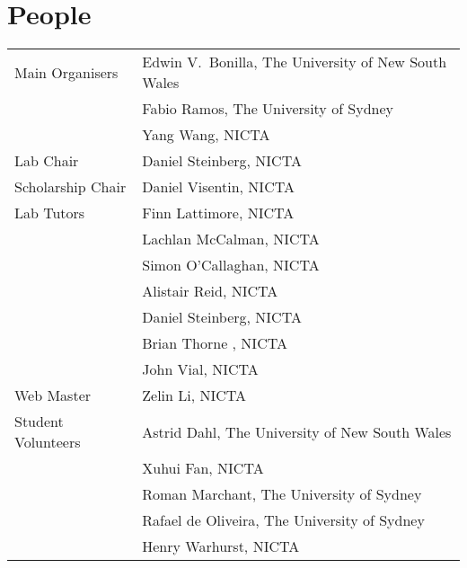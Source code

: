 {}
\section*{People}


\begin{tabular}{p{4.5cm}p{10cm}}
Main Organisers 
& Edwin V.~Bonilla, The University of New South Wales \\ [2mm]
& Fabio Ramos, The University of Sydney \\ [2mm]
& Yang Wang, NICTA  \\ [2mm]
Lab Chair
&
Daniel Steinberg, NICTA \\ [3mm]
Scholarship Chair
& 
Daniel Visentin, NICTA \\ [3mm]
Lab Tutors
&
Finn Lattimore,  NICTA \\ [2mm]
&  Lachlan McCalman, NICTA \\ [2mm]
& Simon O'Callaghan, NICTA \\ [2mm]
& Alistair Reid,  NICTA \\ [2mm]
& Daniel Steinberg, NICTA \\ [2mm]
& Brian Thorne , NICTA \\ [2mm]
& John Vial, NICTA  \\ [3mm]
Web Master 
&
Zelin Li, NICTA \\ [3mm]
Student Volunteers 
& Astrid Dahl, The University of New South Wales  \\ [2mm]
& Xuhui Fan, NICTA   \\ [2mm]
& Roman Marchant, The University of Sydney  \\ [2mm]
& Rafael de Oliveira, The University of Sydney  \\ [2mm]
& Henry Warhurst,  NICTA 
\end{tabular}





